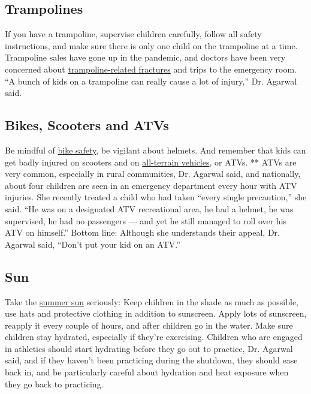 \hypertarget{trampolines}{%
\subsection{Trampolines}\label{trampolines}}

If you have a trampoline, supervise children carefully, follow all
safety instructions, and make sure there is only one child on the
trampoline at a time. Trampoline sales have gone up in the pandemic, and
doctors have been very concerned about
\href{https://www.nytimes3xbfgragh.onion/2020/06/19/well/family/coronavirus-shutdown-children-injuries.html?searchResultPosition=1}{trampoline-related
fractures} and trips to the emergency room. ``A bunch of kids on a
trampoline can really cause a lot of injury,'' Dr. Agarwal said.

\hypertarget{bikes-scooters-and-atvs}{%
\subsection{Bikes, Scooters and ATVs}\label{bikes-scooters-and-atvs}}

Be mindful of
\href{https://www.nytimes3xbfgragh.onion/2019/06/10/well/family/children-bike-scooter-safety.html?searchResultPosition=3}{bike
safety}, be vigilant about helmets. And remember that kids can get badly
injured on scooters and on
\href{https://www.healthychildren.org/English/safety-prevention/at-play/Pages/ATV-Safety-Rules.aspx}{all-terrain
vehicles}, or ATVs. ** ATVs are very common, especially in rural
communities, Dr. Agarwal said, and nationally, about four children are
seen in an emergency department every hour with ATV injuries. She
recently treated a child who had taken ``every single precaution,'' she
said. ``He was on a designated ATV recreational area, he had a helmet,
he was supervised, he had no passengers --- and yet he still managed to
roll over his ATV on himself.'' Bottom line: Although she understands
their appeal, Dr. Agarwal said, ``Don't put your kid on an ATV.''

\hypertarget{sun}{%
\subsection{Sun}\label{sun}}

Take the
\href{https://www.nytimes3xbfgragh.onion/2019/07/15/well/family/shielding-kids-from-the-sun-isnt-just-about-sunscreen.html?searchResultPosition=2}{summer
sun} seriously: Keep children in the shade as much as possible, use hats
and protective clothing in addition to sunscreen. Apply lots of
sunscreen, reapply it every couple of hours, and after children go in
the water. Make sure children stay hydrated, especially if they're
exercising. Children who are engaged in athletics should start hydrating
before they go out to practice, Dr. Agarwal said, and if they haven't
been practicing during the shutdown, they should ease back in, and be
particularly careful about hydration and heat exposure when they go back
to practicing.

